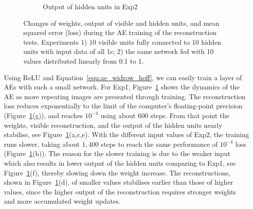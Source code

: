 \begin{figure}
\begin{subfigure}[t]{0.48\textwidth}
		\caption{Output of hidden units in Exp2}
	\end{subfigure}
	\caption[AE training of the reconstruction tests.]{Changes of weights, output of visible and hidden units, and mean squared error (loss) during the AE training of the reconstruction tests. 
		Experiments 1) 10 visible units fully connected to 10 hidden units with input data of all 1s; 2) the same network fed with 10 values distributed linearly from 0.1 to 1.}
	\label{fig:ae_orig}
\end{figure}
Using ReLU and Equation~\ref{equ:ae_widrow_hoff}, we can easily train a layer of AEs with such a small network.
For Exp1, Figure~\ref{fig:ae_orig} shows the dynamics of the AE as more repeating images are presented through training.
The reconstruction loss reduces exponentially to the limit of the computer's floating-point precision (Figure~\ref{fig:ae_orig}(g)), and reaches $10^{-4}$ using about 600 steps.
From that point the weights, visible reconstruction, and the output of the hidden units nearly stabilise, see Figure~\ref{fig:ae_orig}(a,c,e).
With the different input values of Exp2, the training runs slower, taking about $1,400$ steps to reach the same performance of $10^{-4}$ loss (Figure~\ref{fig:ae_orig}(h)).
The reason for the slower training is due to the weaker input which also results in lower output of the hidden units comparing to Exp1, see Figure~\ref{fig:ae_orig}(f), thereby slowing down the weight increase. 
The reconstructions, shown in Figure~\ref{fig:ae_orig}(d), of smaller values stabilises earlier than those of higher values, since the higher output of the reconstruction requires stronger weights and more accumulated weight updates. 
